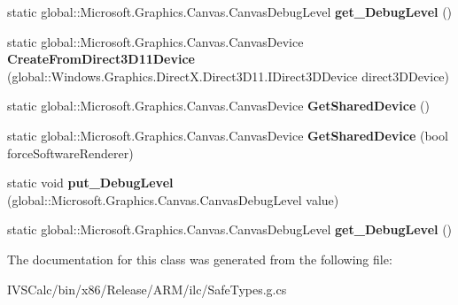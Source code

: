 \begin{DoxyCompactItemize}
static global\+::\+Microsoft.\+Graphics.\+Canvas.\+Canvas\+Debug\+Level {\bfseries get\+\_\+\+Debug\+Level} ()
\item 
\mbox{\label{class_microsoft_1_1_graphics_1_1_canvas_1_1_canvas_device_ac34f7ec06b15bc5f366d17073c7a044b}} 
static global\+::\+Microsoft.\+Graphics.\+Canvas.\+Canvas\+Device {\bfseries Create\+From\+Direct3\+D11\+Device} (global\+::\+Windows.\+Graphics.\+Direct\+X.\+Direct3\+D11.\+I\+Direct3\+D\+Device direct3\+D\+Device)
\item 
\mbox{\label{class_microsoft_1_1_graphics_1_1_canvas_1_1_canvas_device_a773190aa560cbf1b1dc04ae5b544481f}} 
static global\+::\+Microsoft.\+Graphics.\+Canvas.\+Canvas\+Device {\bfseries Get\+Shared\+Device} ()
\item 
\mbox{\label{class_microsoft_1_1_graphics_1_1_canvas_1_1_canvas_device_acb468348f5f4cc3993e0cda3133a3756}} 
static global\+::\+Microsoft.\+Graphics.\+Canvas.\+Canvas\+Device {\bfseries Get\+Shared\+Device} (bool force\+Software\+Renderer)
\item 
\mbox{\label{class_microsoft_1_1_graphics_1_1_canvas_1_1_canvas_device_ab9c64c019ceb46a0ce7750c7672266bf}} 
static void {\bfseries put\+\_\+\+Debug\+Level} (global\+::\+Microsoft.\+Graphics.\+Canvas.\+Canvas\+Debug\+Level value)
\item 
\mbox{\label{class_microsoft_1_1_graphics_1_1_canvas_1_1_canvas_device_ab81e13bacbccaa108210dc500f9f64fd}} 
static global\+::\+Microsoft.\+Graphics.\+Canvas.\+Canvas\+Debug\+Level {\bfseries get\+\_\+\+Debug\+Level} ()
\end{DoxyCompactItemize}


The documentation for this class was generated from the following file\+:\begin{DoxyCompactItemize}
\item 
I\+V\+S\+Calc/bin/x86/\+Release/\+A\+R\+M/ilc/Safe\+Types.\+g.\+cs\end{DoxyCompactItemize}

